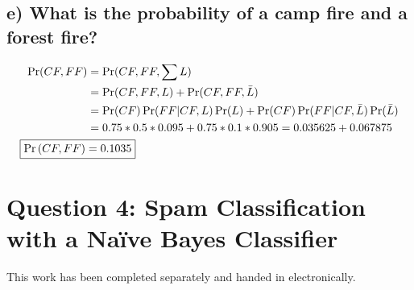 \documentclass[12pt,letterpaper]{article}
\begin{document}
\subsection{e) What is the probability of a camp fire and a forest fire?}
\begin{align*}
\Pr(CF,FF) &= \Pr(CF,FF,\sum{L})\\
&= \Pr(CF,FF,L) + \Pr(CF,FF,\bar{L})\\
&= \Pr(CF)\Pr(FF|CF,L)\Pr(L) + \Pr(CF)\Pr(FF|CF,\bar{L})\Pr(\bar{L})\\
&= 0.75*0.5*0.095 + 0.75*0.1*0.905 = 0.035625 + 0.067875\\
\Aboxed{\Pr\left(CF,FF\right) &= 0.1035}
\end{align*}
\section*{Question 4: Spam Classification with a Na\"{i}ve Bayes Classifier}
This work has been completed separately and handed in electronically.
\end{document}
